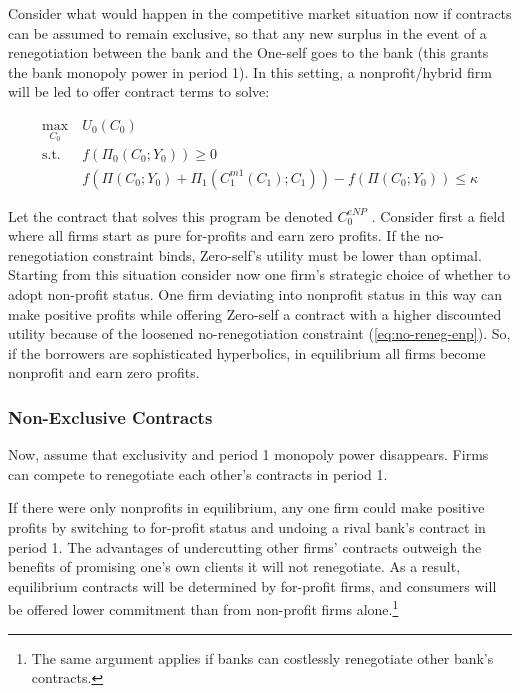 \documentclass[11pt,english]{article}
\theoremstyle{plain}
\theoremstyle{definition}
\begin{document}
Consider what would happen in the competitive market situation now
if contracts can be assumed to remain exclusive, so that any new surplus
in the event of a renegotiation between the bank and the One-self
goes to the bank (this grants the bank monopoly power in period 1).
In this setting, a nonprofit/hybrid firm will be led to offer contract
terms to solve: 

\begin{align}
\underset{C_{0}}{\text{max}} & \ U_{0}\left(C_{0}\right)\\
\text{s.t.} & \ f\left(\Pi_{0}(C_{0};Y_{0})\right)\geq0\\
 & \ f\left(\Pi\left(C_{0};Y_{0}\right)+\Pi_{1}\left(C_{1}^{m1}\left(C_{1}\right);C_{1}\right)\right)-f\left(\Pi\left(C_{0};Y_{0}\right)\right)\leq\kappa\label{eq:no-reneg-enp}
\end{align}

Let the contract that solves this program be denoted $C_{0}^{eNP}$
. Consider first a field where all firms start as pure for-profits
and earn zero profits. If the no-renegotiation constraint binds, Zero-self's
utility must be lower than optimal. Starting from this situation consider
now one firm's strategic choice of whether to adopt non-profit status.
One firm deviating into nonprofit status in this way can make positive
profits while offering Zero-self a contract with a higher discounted
utility because of the loosened no-renegotiation constraint (\ref{eq:no-reneg-enp}).
So, if the borrowers are sophisticated hyperbolics, in equilibrium
all firms become nonprofit and earn zero profits.

\subsubsection{Non-Exclusive Contracts}

Now, assume that exclusivity and period 1 monopoly power disappears.
Firms can compete to renegotiate each other's contracts in period
1.

If there were only nonprofits in equilibrium, any one firm could make
positive profits by switching to for-profit status and undoing a rival
bank's contract in period 1. The advantages of undercutting other
firms' contracts outweigh the benefits of promising one's own clients
it will not renegotiate. As a result, equilibrium contracts will be
determined by for-profit firms, and consumers will be offered lower
commitment than from non-profit firms alone.\footnote{The same argument applies if banks can costlessly renegotiate other
bank's contracts.}
\end{document}
